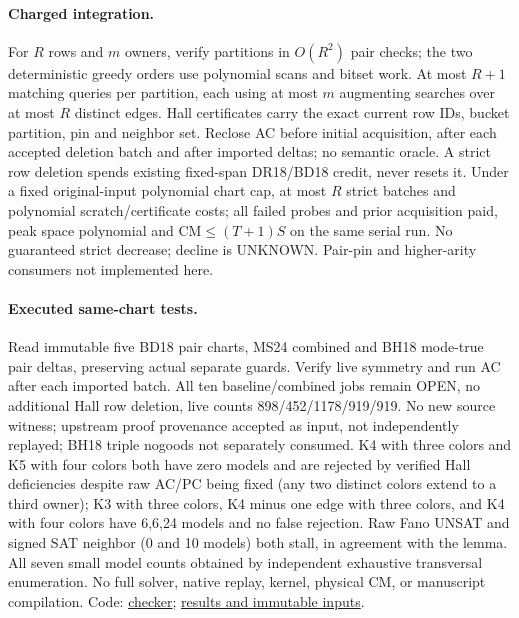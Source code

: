 \documentclass[11pt]{article}
\begin{document}
\paragraph{Charged integration.}
For $R$ rows and $m$ owners, verify partitions in $O(R^2)$ pair checks; the two deterministic greedy orders use polynomial scans and bitset work. At most $R+1$ matching queries per partition, each using at most $m$ augmenting searches over at most $R$ distinct edges. Hall certificates carry the exact current row IDs, bucket partition, pin and neighbor set. Reclose AC before initial acquisition, after each accepted deletion batch and after imported deltas; no semantic oracle. A strict row deletion spends existing fixed-span DR18/BD18 credit, never resets it. Under a fixed original-input polynomial chart cap, at most $R$ strict batches and polynomial scratch/certificate costs; all failed probes and prior acquisition paid, peak space polynomial and $\mathrm{CM}\le(T+1)S$ on the same serial run. No guaranteed strict decrease; decline is UNKNOWN. Pair-pin and higher-arity consumers not implemented here.
\paragraph{Executed same-chart tests.}
Read immutable five BD18 pair charts, MS24 combined and BH18 mode-true pair deltas, preserving actual separate guards. Verify live symmetry and run AC after each imported batch. All ten baseline/combined jobs remain OPEN, no additional Hall row deletion, live counts 898/452/1178/919/919. No new source witness; upstream proof provenance accepted as input, not independently replayed; BH18 triple nogoods not separately consumed. K4 with three colors and K5 with four colors both have zero models and are rejected by verified Hall deficiencies despite raw AC/PC being fixed (any two distinct colors extend to a third owner); K3 with three colors, K4 minus one edge with three colors, and K4 with four colors have 6,6,24 models and no false rejection. Raw Fano UNSAT and signed SAT neighbor (0 and 10 models) both stall, in agreement with the lemma. All seven small model counts obtained by independent exhaustive transversal enumeration. No full solver, native replay, kernel, physical CM, or manuscript compilation. Code: \href{https://github.com/j15marti/pnp/commit/a80da947d341db10c1aa4fad96124e81713f623c}{checker}; \href{https://github.com/j15marti/pnp/commit/0f45e763f7c7ff6a613c2f4c90cdd7fbd8d3677f}{results and immutable inputs}.
\end{document}
